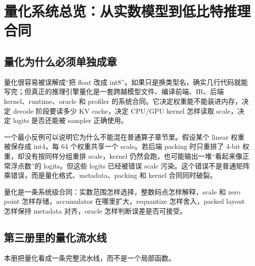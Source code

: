 \section{量化系统总览：从实数模型到低比特推理合同}

\subsection{量化为什么必须单独成章}

量化很容易被误解成“把 float 改成 int8”。如果只是换类型名，确实几行代码就能写完；但真正的推理引擎量化是一套跨越模型文件、编译前端、IR、后端 kernel、runtime、oracle 和 profiler 的系统合同。它决定权重能不能装进内存，决定 decode 阶段要读多少 KV cache，决定 CPU/GPU kernel 怎样读取 scale，决定 logits 是否还能被 sampler 正确使用。

一个最小反例可以说明它为什么不能混在普通算子章节里。假设某个 linear 权重被保存成 int4，每 64 个权重共享一个 scale。若后端 packing 时只重排了 4-bit 权重，却没有按同样分组重排 scale，kernel 仍然会跑，也可能输出一堆“看起来像正常浮点数”的 logits。但这些 logits 已经被错误 scale 污染。这个错误不是普通矩阵乘错误，而是量化格式、metadata、packing 和 kernel 合同同时破裂。

\begin{keyidea}
量化是一条系统级合同：实数范围怎样选择，整数码点怎样解释，scale 和 zero point 怎样存储，accumulator 在哪里扩大，requantize 怎样舍入，packed layout 怎样保持 metadata 对齐，oracle 怎样判断误差是否可接受。
\end{keyidea}

\subsection{第三册里的量化流水线}

本册把量化看成一条完整流水线，而不是一个局部函数。

